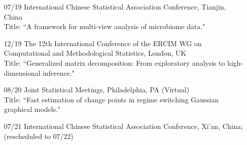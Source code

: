 \documentclass[10pt]{article}
\begin{document}
\begin{enumerate}
\item[07/19] International Chinese Statistical Association Conference, Tianjin, China\\
Title: {``A framework for multi-view analysis of microbiome data."} 
\item[12/19] The 12th International Conference of the ERCIM WG on Computational and Methodological Statistics, London, UK \\
Title: {``Generalized matrix decomposition: From exploratory analysis to high-dimensional inference."}
\item[08/20] Joint Statistical Meetings, Philadelphia, PA  (Virtual) \\
Title: {``Fast estimation of change points in regime switching Gaussian graphical models."} 
\item[07/21] International Chinese Statistical Association Conference, Xi'an, China; (rescheduled to 07/22)

\end{enumerate}
\end{document}

